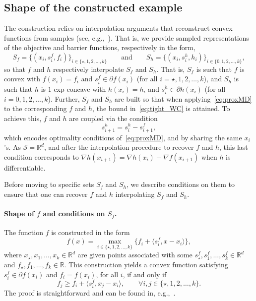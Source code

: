 \documentclass[a4paper]{article}
\renewcommand{\geq}{\geqslant}
\renewcommand{\SS}{\mathcal{S}}
\newcommand{\R}{\mathbb{R}}
\newcommand{\ip}[2]{\langle #1, #2\rangle}
\begin{document}
\subsection{Shape of the constructed example}\label{sec:tight_shape}

The construction relies on interpolation arguments that reconstruct convex functions from samples (see, e.g.,~\cite{taylor2017smooth}).
That is, we  provide sampled representations of the objective and barrier functions, respectively in the form,
\begin{equation}\label{eq:sampled_f_h}
	S_f=\{(x_i,s_i^f,f_i)\}_{i\in\{\star,1,2,\ldots,k\}}
	\qquad\text{and}\qquad
	S_h=\{(x_i,s_i^h,h_i)\}_{i\in\{0,1,2,\ldots,k\}},
\end{equation}
so that $f$ and $h$ respectively interpolate $S_f$ and $S_h$.
That is, $S_f$ is such that $f$ is convex with $f(x_i)=f_i$ and $s_i^f\in\partial f(x_i)$ (for all $i=\star,1,2,\ldots,k$), and $S_h$ is such that $h$ is $1$-exp-concave with $h(x_i)=h_i$ and $s_i^h\in\partial h(x_i)$ (for all $i=0,1,2,\ldots,k$).
Further, $S_f$ and $S_h$ are built so that when applying~\eqref{eq:proxMD} to the corresponding $f$ and $h$, the bound in~\eqref{eq:tight_WC} is attained.
To achieve this, $f$ and $h$ are coupled via the condition
\[s_{i+1}^h = s_{i}^h - s_{i+1}^f,\]
which encodes optimality conditions of~\eqref{eq:proxMD}, and by sharing the same $x_i$'s.
As $\SS=\R^d$, and after the interpolation procedure to recover $f$ and $h$, this last condition corresponds to $\nabla h(x_{i+1})=\nabla h(x_i)-\nabla f(x_{i+1})$ when $h$ is differentiable.

Before moving to specific sets $S_f$ and $S_h$, we describe conditions on them to ensure that one can recover $f$ and $h$ interpolating $S_f$ and $S_h$.

\paragraph{Shape of $f$ and conditions on $S_f$.}
The function $f$ is constructed in the form
\begin{equation}\label{eq:model_f}
        f(x)
        =
        \max_{i\in\{\star,1,2,\ldots,k\}}
        \bigg\{ f_i+\ip{s_i^f}{x-x_i}\bigg\},
\end{equation}
where $x_\star, x_1,\dots, x_k\in\R^d$ are given points associated with some $s_\star^f,s_1^f,\ldots,s_k^f\in\R^d$ and $f_\star,f_1,\ldots,f_k\in\R$.
This construction yields a convex function satisfying $s_i^f\in\partial f(x_i)$ and $f_i=f(x_i)$, for all $i$, if and only if
\begin{equation}\label{eq:cvx_interp}
f_j \geq f_i+\ip{s_i^f}{x_j-x_i},
        \qquad \forall i,j\in\{\star,1,2,\ldots,k\}.
\end{equation}
The proof is straightforward and can be found in, e.g.,~\cite[Section 2.3]{taylor2017smooth}.
\end{document}
